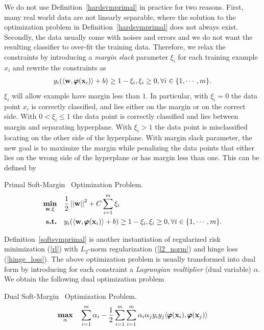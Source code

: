 {%
We do not use Definition~\ref{hardsvmprimal} in practice for two reasons. 
First, many real world data are not linearly separable, where the solution to the optimization problem in Definition~\ref{hardsvmprimal} does not always exist.
Secondly, the data usually come with noises and errors and we do not want the resulting classifier to over-fit the training data.
Therefore, we relax the constraints by introducing a \textit{margin slack} parameter $\xi_i$ for each training example $x_i$ and rewrite the constraints as 
\begin{align}
	y_i(\langle \mathbf {w}, \pmb \varphi(\mathbf {x}_i) \rangle + b) \ge 1-\xi_i, \xi_i\ge 0, \forall i\in\{1,\cdots,m\}. \label{softsvmconstraint}
\end{align}
$\xi_i$ will allow example have margin less than $1$.
In particular, with $\xi_i=0$ the data point $x_i$ is correctly classified, and lies either on the margin or on the correct side.
With $0<\xi_i\le 1$ the data point is correctly classified and lies between margin and separating hyperplane.
With $\xi_i>1$ the data point is misclassified locating on the other side of the hyperplane.
With margin slack parameter, the new goal is to maximize the margin while penalizing the data points that either lies on the wrong side of the hyperplane or has margin less than one.
This can be defined by
\begin{definition}{Primal Soft-Margin \svm\ Optimization Problem.}\label{softsvmprimal}
	\begin{align*}
		\underset{\mathbf {w},\xi}{\textbf{min}} & \quad\frac{1}{2}\left|\left| \mathbf {w} \right|\right|^2 + C\sum_{i=1}^{m}\xi_i\\
		\textbf{s.t.} & \quad y_i(\langle \mathbf {w}, \pmb \varphi(\mathbf {x}_i) \rangle + b) \ge 1-\xi_i, \xi_i\ge 0, \forall i\in\{1,\cdots,m\}.
	\end{align*}
\end{definition}
Definition~\ref{softsvmprimal} is another instantiation of regularized risk minimization (\ref{rl}) with $L_2$-norm regularization (\ref{l2_norm}) and hinge loss (\ref{hinge_loss}).
The above optimization problem is usually transformed into dual form by introducing for each constraint a \textit{Lagrangian multiplier} (dual variable) $\alpha$.
We obtain the following dual optimization problem
\begin{definition}{Dual Soft-Margin \svm\ Optimization Problem.}\label{softsvmdual}
	\begin{align*}
		\underset{\valpha}{\maximize} & \quad\sum_{i=1}^{m}\alpha_i -\frac{1}{2}\sum_{i=1}^{m}\sum_{i=1}^{m}\alpha_i\alpha_jy_iy_j\ip{\varphib(\vx_i)}{\varphib(\vx_j)}\\

\end{align*}
\end{definition}}
